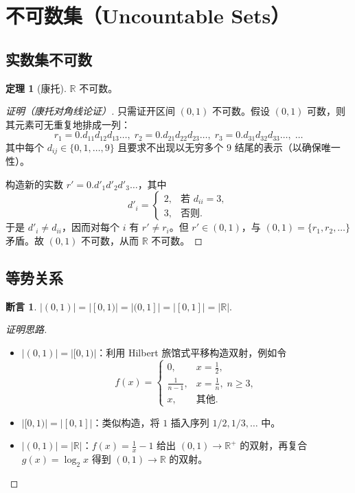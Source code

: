 \documentclass[UTF8,11pt,a4paper]{ctexbook}   %
\theoremstyle{definition}
\newtheorem{theorem}{定理}[section]
\newtheorem{proposition}{断言}[section]
\begin{document}
\section{不可数集（Uncountable Sets）}

\subsection{实数集不可数}

\begin{theorem}[康托]
$\mathbb{R}$ 不可数。
\end{theorem}

\begin{proof}[证明（康托对角线论证）]
只需证开区间 $(0,1)$ 不可数。假设 $(0,1)$ 可数，则其元素可无重复地排成一列：
\[
r_1 = 0.d_{11}d_{12}d_{13}\dots,\;
r_2 = 0.d_{21}d_{22}d_{23}\dots,\;
r_3 = 0.d_{31}d_{32}d_{33}\dots,\;\ldots
\]
其中每个 $d_{ij}\in\{0,1,\dots,9\}$ 且要求不出现以无穷多个 $9$ 结尾的表示（以确保唯一性）。

构造新的实数 $r' = 0.d'_1d'_2d'_3\dots$，其中
\[
d'_i = \begin{cases}
2, & \text{若 } d_{ii}=3,\\
3, & \text{否则}.
\end{cases}
\]
于是 $d'_i \neq d_{ii}$，因而对每个 $i$ 有 $r' \neq r_i$。但 $r'\in(0,1)$，与 $(0,1)=\{r_1,r_2,\dots\}$ 矛盾。故 $(0,1)$ 不可数，从而 $\mathbb{R}$ 不可数。
\end{proof}

\subsection{等势关系}

\begin{proposition}
$|(0,1)| = |[0,1)| = |(0,1]| = |[0,1]| = |\mathbb{R}|$.
\end{proposition}

\begin{proof}[证明思路]
\begin{itemize}
    \item $|(0,1)|=|[0,1)|$：利用 Hilbert 旅馆式平移构造双射，例如令
    \[
    f(x)=\begin{cases}
    0, & x=\frac12,\\
    \frac{1}{n-1}, & x=\frac1n,\; n\geq3,\\
    x, & \text{其他}.
    \end{cases}
    \]
    \item $|[0,1)|=|[0,1]|$：类似构造，将 $1$ 插入序列 $1/2,1/3,\dots$ 中。
    \item $|(0,1)|=|\mathbb{R}|$：$f(x)=\frac1x-1$ 给出 $(0,1)\to\mathbb{R}^+$ 的双射，再复合 $g(x)=\log_2 x$ 得到 $(0,1)\to\mathbb{R}$ 的双射。
\end{itemize}
\end{proof}
\end{document}
